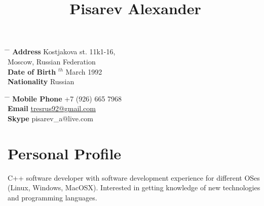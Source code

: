 \documentclass[10pt]{article} %
\begin{document}

\title{Pisarev Alexander} %


\parbox{0.5\textwidth}{ %
\begin{tabbing} %
\hspace{3cm} \= \hspace{4cm} \= \kill %
{\bf Address} \> Kostjakova st. 11k1-16,\\ %
\> Moscow, Russian Federation \\ %
{\bf Date of Birth} $^{th}$ March 1992 \\ %
{\bf Nationality} \> Russian %
\end{tabbing}}
\hfill %
\parbox{0.5\textwidth}{ %
\begin{tabbing} %
\hspace{3cm} \= \hspace{4cm} \= \kill %
{\bf Mobile Phone} \> +7 (926) 665 7968 \\ %
{\bf Email} \> \href{mailto:tresrus92@gmail.com}{tresrus92@gmail.com} \\ %
{\bf Skype} \> pisarev\_a@live.com \\ %
\end{tabbing}}


\section{Personal Profile}

C++ software developer with software development experience for different OSes (Linux, Windows, MacOSX). Interested in getting knowledge of new technologies and programming languages.

\end{document}
